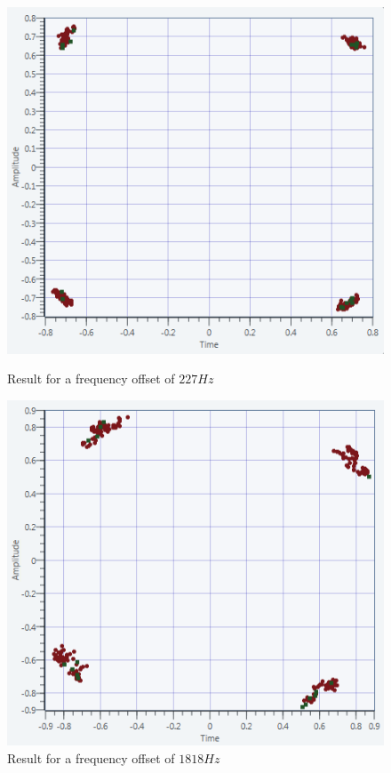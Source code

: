 \documentclass[frenchb, oneside, headings=normal]{scrartcl}
\begin{document}
\begin{figure}[!ht]
  \begin{minipage}[b]{0.48\linewidth}
        \centering \includegraphics[scale=0.7]{img/USRP_carrieroffset_227.PNG}
    \caption{Result for a frequency offset of $227 Hz$}
    \label{fig8}
    \end{minipage}\hfill
    \begin{minipage}[b]{0.48\linewidth}
         \centering \includegraphics[scale=0.7]{img/USRP_carrieroffset_1818.PNG}
          \caption{Result for a frequency offset of $1818 Hz$}
          \label{fig9}
    \end{minipage}
\end{figure}
\end{document}
